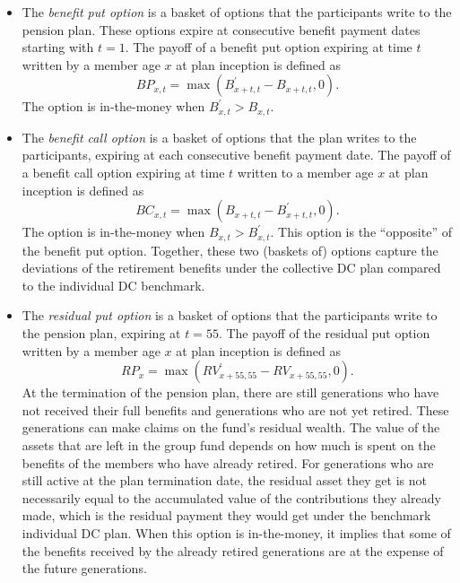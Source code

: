 \documentclass{sfuthesis}
\numberwithin{equation}{chapter}
\begin{document}
		\begin{itemize}
			\item The \textit{benefit put option} is a basket of options that the participants write to the pension plan. These options expire at consecutive benefit payment dates starting with $t=1$. The payoff of a benefit put option expiring at time $t$ written by a member age $x$ at plan inception is defined as
			\begin{equation}
			\label{eq:VB_15}
			BP_{x,t} = \max(B_{x+t,t}^{'} - B_{x+t,t}, 0).
			\end{equation}
			The option is in-the-money when $B_{x,t}^{'} > B_{x,t}$. 
			
			\item The \textit{benefit call option} is a basket of options that the plan writes to the participants, expiring at each consecutive benefit payment date. The payoff of a benefit call option expiring at time $t$ written to a member age $x$ at plan inception is defined as
			\begin{equation}
			\label{eq:VB_16}
			BC_{x,t} = \max(B_{x+t,t} - B_{x+t,t}^{'}, 0).
			\end{equation}
			The option is in-the-money when $B_{x,t} > B_{x,t}^{'}$. This option is the ``opposite'' of the benefit put option. Together, these two (baskets of) options capture the deviations of the retirement benefits under the collective DC plan compared to the individual DC benchmark.
			
			\item The \textit{residual put option} is a basket of options that the participants write to the pension plan, expiring at $t= 55$. The payoff of the residual put option written by a member age $x$ at plan inception is defined as
			\begin{equation}
			\label{eq:VB_17}
			RP_{x} = \max(RV^{'}_{x+55,55} - RV_{x+55,55},0).
			\end{equation}
			At the termination of the pension plan, there are still generations who have not received their full benefits and generations who are not yet retired. These generations can make claims on the fund's residual wealth. The value of the assets that are left in the group fund depends on how much is spent on the benefits of the members who have already retired. For generations who are still active at the plan termination date, the residual asset they get is not necessarily equal to the accumulated value of the contributions they already made, which is the residual payment they would get under the benchmark individual DC plan. When this option is in-the-money, it implies that some of the benefits received by the already retired generations are at the expense of the future generations. 
			

\end{itemize}
\end{document}
